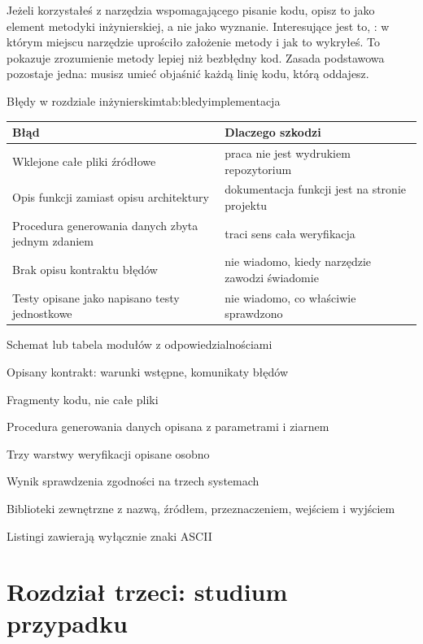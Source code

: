 Jeżeli korzystałeś z narzędzia wspomagającego pisanie kodu, opisz to jako element metodyki inżynierskiej, a nie jako wyznanie. Interesujące jest to, : w którym miejscu narzędzie uprościło założenie metody i jak to wykryłeś. To pokazuje zrozumienie metody lepiej niż bezbłędny kod. Zasada podstawowa pozostaje jedna: musisz umieć objaśnić każdą linię kodu, którą oddajesz.

\begin{tabelaepi}{Błędy w rozdziale inżynierskim}{tab:bledyimplementacja}
\begin{tabular}{@{}p{6.6cm}p{6.6cm}@{}}
\toprule
Błąd & Dlaczego szkodzi \\
\midrule
Wklejone całe pliki źródłowe & praca nie jest wydrukiem repozytorium \\
Opis funkcji zamiast opisu architektury & dokumentacja funkcji jest na stronie projektu \\
Procedura generowania danych zbyta jednym zdaniem & traci sens cała weryfikacja \\
Brak opisu kontraktu błędów & nie wiadomo, kiedy narzędzie zawodzi świadomie \\
Testy opisane jako napisano testy jednostkowe & nie wiadomo, co właściwie sprawdzono \\
\bottomrule
\end{tabular}
\end{tabelaepi}

\begin{kontrolna}
\item Schemat lub tabela modułów z odpowiedzialnościami
\item Opisany kontrakt: warunki wstępne, komunikaty błędów
\item Fragmenty kodu, nie całe pliki
\item Procedura generowania danych opisana z parametrami i ziarnem
\item Trzy warstwy weryfikacji opisane osobno
\item Wynik sprawdzenia zgodności na trzech systemach
\item Biblioteki zewnętrzne z nazwą, źródłem, przeznaczeniem, wejściem i wyjściem
\item Listingi zawierają wyłącznie znaki ASCII
\end{kontrolna}

\section{Rozdział trzeci: studium przypadku}

